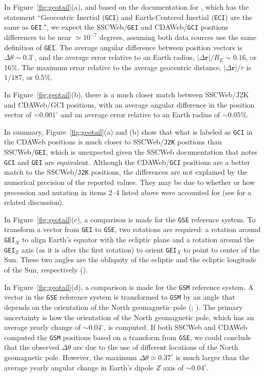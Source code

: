 \documentclass[draft]{agujournal2019}
\begin{document}
In Figure~\ref{fig:geotail}(a), and based on the documentation for , which has the statement ``Geocentric Inertial (\texttt{GCI}) and Earth-Centered Inertial (\texttt{ECI}) are the same as \texttt{GEI}.", we expect the SSCWeb/\texttt{GEI} and CDAWeb/\texttt{GCI} positions differences to be near $\simeq 10^{-7}$ degrees, assuming both data sources use the same definition of \texttt{GEI}. The average angular difference between position vectors is $\Delta \theta \sim 0.3^\circ$, and the average error relative to an Earth radius, $|\Delta\mathbf{r}|/R_E\sim 0.16$, or 16\%. The maximum error relative to the average geocentric distance, $|\Delta \mathbf{r}|/\overline{r}$ is $1/187$, or $0.5$\%.

In Figure~\ref{fig:geotail}(b), there is a much closer match between SSCWeb/J2K and CDAWeb/GCI positions, with an average angular difference in the position vector of ${\sim}0.001^\circ$ and an average error relative to an Earth radius of ${\sim}0.05$\%. 

In summary, Figure~\ref{fig:geotail}(a) and (b) show that what is labeled as \texttt{GCI} in the CDAWeb positions is much closer to SSCWeb/\texttt{J2K} positions than SSCWeb/\texttt{GEI}, which is unexpected given the SSCWeb documentation that notes \texttt{GCI} and \texttt{GEI} are equivalent. Although the CDAWeb/\texttt{GCI} positions are a better match to the SSCWeb/\texttt{J2K} positions, the differences are not explained by the numerical precision of the reported values. They may be due to whether or how precession and nutation in items 2--4 listed above were accounted for (see  for a related discussion).

In Figure~\ref{fig:geotail}(c), a comparison is made for the \texttt{GSE} reference system. To transform a vector from \texttt{GEI} to \texttt{GSE}, two rotations are required: a rotation around \texttt{GEI}$_X$ to align Earth's equator with the ecliptic plane and a rotation around the \texttt{GEI}$_Z$ axis (as it is after the first rotation) to orient \texttt{GEI}$_X$ to point to center of the Sun. These two angles are the obliquity of the ecliptic and the ecliptic longitude of the Sun, respectively ().

In Figure~\ref{fig:geotail}(d), a comparison is made for the \texttt{GSM} reference system. A vector in the \texttt{GSE} reference system is transformed to \texttt{GSM} by an angle that depends on the orientation of the North geomagnetic pole (; ). The primary uncertainty is how the orientation of the North geomagnetic pole, which has an average yearly change of ${\sim}0.04^\circ$, is computed. If both SSCWeb and CDAWeb computed the \texttt{GSM} positions based on a transform from \texttt{GSE}, we could conclude that the observed $\Delta \theta$ are due to the use of different locations of the North geomagnetic pole. However, the maximum $\Delta \theta \simeq 0.37^\circ$ is much larger than the average yearly angular change in Earth's dipole $Z$ axis of ${\sim}0.04^\circ$.
\end{document}
